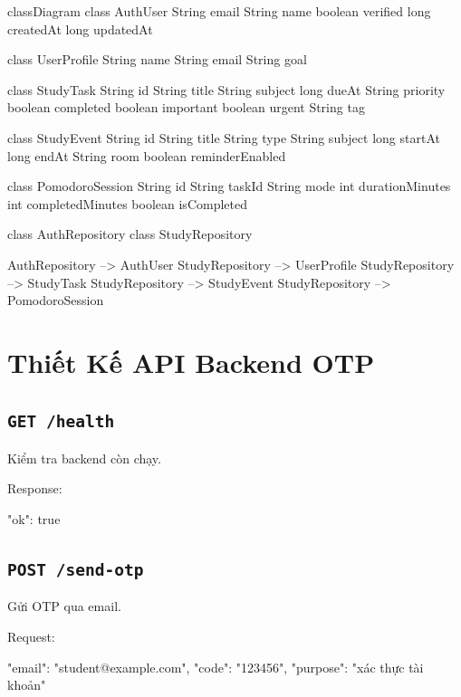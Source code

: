 \documentclass[12pt,a4paper]{report}
\begin{document}
\begin{CodeBlock}
classDiagram
    class AuthUser {
        String email
        String name
        boolean verified
        long createdAt
        long updatedAt
    }

    class UserProfile {
        String name
        String email
        String goal
    }

    class StudyTask {
        String id
        String title
        String subject
        long dueAt
        String priority
        boolean completed
        boolean important
        boolean urgent
        String tag
    }

    class StudyEvent {
        String id
        String title
        String type
        String subject
        long startAt
        long endAt
        String room
        boolean reminderEnabled
    }

    class PomodoroSession {
        String id
        String taskId
        String mode
        int durationMinutes
        int completedMinutes
        boolean isCompleted
    }

    class AuthRepository
    class StudyRepository

    AuthRepository --> AuthUser
    StudyRepository --> UserProfile
    StudyRepository --> StudyTask
    StudyRepository --> StudyEvent
    StudyRepository --> PomodoroSession
\end{CodeBlock}

\section{Thiết Kế API Backend OTP}

\subsection{\texttt{GET /health}}

Kiểm tra backend còn chạy.

Response:

\begin{CodeBlock}
{"ok": true}
\end{CodeBlock}

\subsection{\texttt{POST /send-otp}}

Gửi OTP qua email.

Request:

\begin{CodeBlock}
{
  "email": "student@example.com",
  "code": "123456",
  "purpose": "xác thực tài khoản"
}
\end{CodeBlock}
\end{document}
